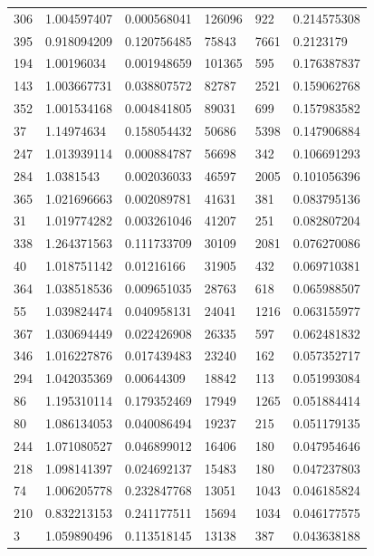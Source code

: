 \documentclass{cumcmthesis}
\begin{document}
\begin{longtable}{l|llll|l}
    306 & 1.004597407 & 0.000568041 & 126096 & 922     & 0.214575308 \\
    395 & 0.918094209 & 0.120756485 & 75843  & 7661    & 0.2123179   \\
    194 & 1.00196034  & 0.001948659 & 101365 & 595     & 0.176387837 \\
    143 & 1.003667731 & 0.038807572 & 82787  & 2521    & 0.159062768 \\
    352 & 1.001534168 & 0.004841805 & 89031  & 699     & 0.157983582 \\
    37  & 1.14974634  & 0.158054432 & 50686  & 5398    & 0.147906884 \\
    247 & 1.013939114 & 0.000884787 & 56698  & 342     & 0.106691293 \\
    284 & 1.0381543   & 0.002036033 & 46597  & 2005    & 0.101056396 \\
    365 & 1.021696663 & 0.002089781 & 41631  & 381     & 0.083795136 \\
    31  & 1.019774282 & 0.003261046 & 41207  & 251     & 0.082807204 \\
    338 & 1.264371563 & 0.111733709 & 30109  & 2081    & 0.076270086 \\
    40  & 1.018751142 & 0.01216166  & 31905  & 432     & 0.069710381 \\
    364 & 1.038518536 & 0.009651035 & 28763  & 618     & 0.065988507 \\
    55  & 1.039824474 & 0.040958131 & 24041  & 1216    & 0.063155977 \\
    367 & 1.030694449 & 0.022426908 & 26335  & 597     & 0.062481832 \\
    346 & 1.016227876 & 0.017439483 & 23240  & 162     & 0.057352717 \\
    294 & 1.042035369 & 0.00644309  & 18842  & 113     & 0.051993084 \\
    86  & 1.195310114 & 0.179352469 & 17949  & 1265    & 0.051884414 \\
    80  & 1.086134053 & 0.040086494 & 19237  & 215     & 0.051179135 \\
    244 & 1.071080527 & 0.046899012 & 16406  & 180     & 0.047954646 \\
    218 & 1.098141397 & 0.024692137 & 15483  & 180     & 0.047237803 \\
    74  & 1.006205778 & 0.232847768 & 13051  & 1043    & 0.046185824 \\
    210 & 0.832213153 & 0.241177511 & 15694  & 1034    & 0.046177575 \\
    3   & 1.059890496 & 0.113518145 & 13138  & 387     & 0.043638188 \\

\end{longtable}
\end{document}
